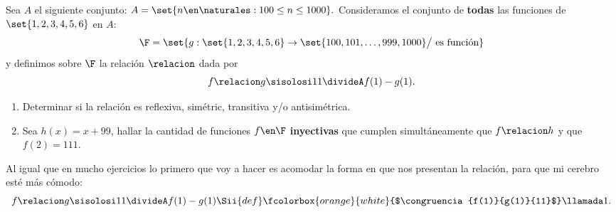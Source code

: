 \begin{enunciado}{\ejExtra}
	Sea $A$ el siguiente conjunto: $A = \set{n \en \naturales :  100 \leq n \leq 1000}.$ Consideramos el conjunto
	de \textbf{todas} las funciones de $\set{1,2,3,4,5,6}$ en $A$:
	$$
		\F = \set{g: \set{1,2,3,4,5,6} \to \set{100,101,\dots,999,1000} \big/ \text{ es función}}
	$$
	y definimos sobre $\F$ la relación $\relacion$ dada por
	$$
		f \relacion g \sisolosi 11 \divideA f(1) - g(1).
	$$
	\begin{enumerate}[label=\alph*)]
		\item Determinar si la relación es reflexiva, simétric, transitiva y/o antisimétrica.

		\item Sea $h(x) = x + 99$, hallar la cantidad de funciones $f \en \F$ \textbf{inyectivas} que cumplen simultáneamente que
		      $f \relacion h$ y que $f(2) = 111$.
	\end{enumerate}
\end{enunciado}

Al igual que en mucho ejercicios lo primero que voy a hacer es acomodar la forma en que nos presentan la relación, para que mi
cerebro esté más cómodo:
$$
	f \relacion g \sisolosi 11 \divideA f(1) - g(1)
	\Sii{def}
	\fcolorbox{orange}{white}{$\congruencia{f(1)}{g(1)}{11}$}\llamada1.
$$

